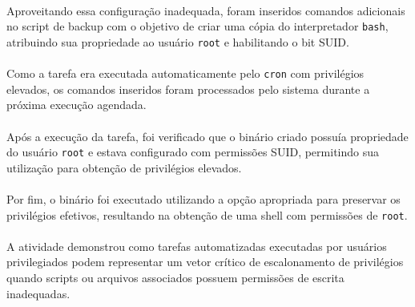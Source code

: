 \paragraph{}
Aproveitando essa configuração inadequada, foram inseridos comandos adicionais
no script de backup com o objetivo de criar uma cópia do interpretador
\texttt{bash}, atribuindo sua propriedade ao usuário \texttt{root} e
habilitando o bit SUID.

\paragraph{}
Como a tarefa era executada automaticamente pelo \texttt{cron} com privilégios
elevados, os comandos inseridos foram processados pelo sistema durante a
próxima execução agendada.

\paragraph{}
Após a execução da tarefa, foi verificado que o binário criado possuía
propriedade do usuário \texttt{root} e estava configurado com permissões SUID,
permitindo sua utilização para obtenção de privilégios elevados.

\paragraph{}
Por fim, o binário foi executado utilizando a opção apropriada para preservar
os privilégios efetivos, resultando na obtenção de uma shell com permissões de
\texttt{root}.

\paragraph{}
A atividade demonstrou como tarefas automatizadas executadas por usuários
privilegiados podem representar um vetor crítico de escalonamento de
privilégios quando scripts ou arquivos associados possuem permissões de escrita
inadequadas.
